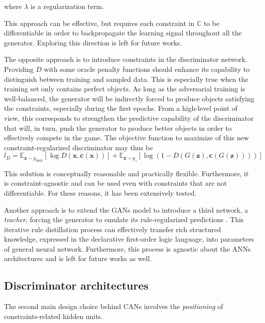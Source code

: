 where $\lambda$ is a regularization term.

This approach can be effective, but requires each constraint in $\mathbb{C}$ to be differentiable in order to backpropagate the learning signal throughout all the generator. Exploring this direction is left for future works.
    
The opposite approach is to introduce constraints in the discriminator network. Providing $D$ with some oracle penalty functions should enhance its capability to distinguish between training and sampled data. This is especially true when the training set only contains perfect objects. As long as the adversarial training is well-balanced, the generator will be indirectly forced to produce objects satisfying the constraints, especially during the first epochs. From a high-level point of view, this corresponds to strengthen the predictive capability of the discriminator that will, in turn, push the generator to produce better objects in order to effectively compete in the game. The objective function to maximize of this new constraint-regularized discriminator may thus be
\[
l_D = \mathbb{E}_{\bm{x} \sim p_{data}} [\log D(\bm{x}, \bm{c}(\bm{x}))] + \mathbb{E}_{\bm{z} \sim p_z} [\log (1 - D(G(\bm{z}), \bm{c}(G(\bm{z}))))] 
\]

This solution is conceptually reasonable and practically flexible. Furthermore, it is constraint-agnostic and can be used even with constraints that are not differentiable. For these reasons, it has been extensively tested.

Another approach is to extend the GANs model to introduce a third network, a \textit{teacher}, forcing the generator to emulate its rule-regularized predictions \cite{harnessing}. This iterative rule distillation process can effectively transfer rich structured knowledge, expressed in the declarative first-order logic language, into parameters of general neural network. Furthermore, this process is agnostic about the ANNs architectures and is left for future works as well.


\subsection{Discriminator architectures}

The second main design choice behind CANs involves the \textit{positioning} of constraints-related hidden units.

